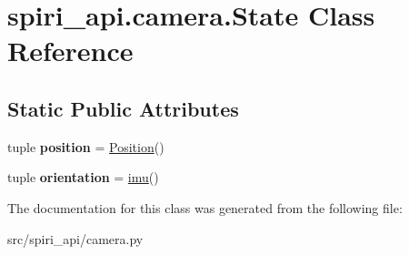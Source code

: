 \hypertarget{classspiri__api_1_1camera_1_1_state}{\section{spiri\-\_\-api.\-camera.\-State \-Class \-Reference}
\label{classspiri__api_1_1camera_1_1_state}
}
\subsection*{\-Static \-Public \-Attributes}
\begin{DoxyCompactItemize}
\item 
\hypertarget{classspiri__api_1_1camera_1_1_state_acdc80f3fb9a36f118680f6031f26fd67}{tuple {\bfseries position} = \hyperlink{classspiri__api_1_1camera_1_1_position}{\-Position}()}\label{classspiri__api_1_1camera_1_1_state_acdc80f3fb9a36f118680f6031f26fd67}

\item 
\hypertarget{classspiri__api_1_1camera_1_1_state_a49f48ee31968e3d821fd6b581debc0e4}{tuple {\bfseries orientation} = \hyperlink{classspiri__api_1_1camera_1_1imu}{imu}()}\label{classspiri__api_1_1camera_1_1_state_a49f48ee31968e3d821fd6b581debc0e4}

\end{DoxyCompactItemize}


\-The documentation for this class was generated from the following file\-:\begin{DoxyCompactItemize}
\item 
src/spiri\-\_\-api/camera.\-py\end{DoxyCompactItemize}
